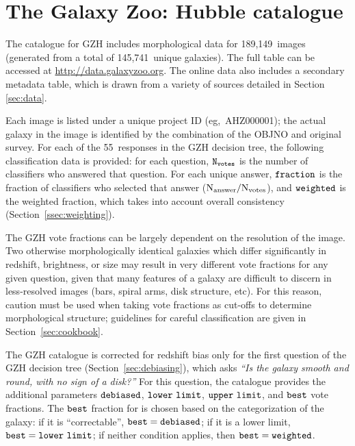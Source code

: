 \documentclass[a4paper,fleqn,usenatbib]{mnras}
\begin{document}
\section{The Galaxy Zoo: Hubble catalogue}\label{sec:results}

The catalogue for GZH includes morphological data for 189,149~images
(generated from a total of 145,741~unique galaxies). The full table can be
accessed at \url{http://data.galaxyzoo.org}. The online data also includes a
secondary metadata table, which is drawn from a variety of sources detailed in
Section \ref{sec:data}. 

Each image is listed under a unique project ID (eg,~AHZ000001); the actual
galaxy in the image is identified by the combination of the OBJNO and original
survey. For each of the 55~responses in the GZH decision tree, the following
classification data is provided: for each question, $\tt N_{votes}$ is the
number of classifiers who answered that question. For each unique answer, $\tt fraction$
is the fraction of classifiers who selected that answer ($\rm N_{answer}/N_{votes}$), and
$\tt weighted$ is the weighted fraction, which takes into account overall
consistency (Section~\ref{ssec:weighting}). 

The GZH vote fractions can be largely dependent on the resolution of the image.
Two otherwise morphologically identical galaxies which differ significantly in
redshift, brightness, or size may result in very different vote fractions for
any given question, given that many features of a galaxy are difficult to
discern in less-resolved images (bars, spiral arms, disk structure, etc). For
this reason, caution must be used when taking vote fractions as cut-offs to
determine morphological structure; guidelines for careful classification are
given in Section~\ref{sec:cookbook}. 

The GZH catalogue is corrected for redshift bias only for the first
question of the GZH decision tree (Section~\ref{sec:debiasing}), which asks
{\it ``Is the galaxy smooth and round, with no sign of a disk?''} For this
question, the catalogue provides the additional parameters $\tt debiased$, $\tt
lower~limit$, $\tt upper~limit$, and $\tt best$ vote fractions. The $\tt best$
fraction for \ffeatures{} is chosen based on the categorization of the galaxy:
if it is ``correctable'', $\tt best = debiased$; if it is a lower limit, $\tt
best = lower~limit$; if neither condition applies, then $\tt best = weighted$.
\end{document}
